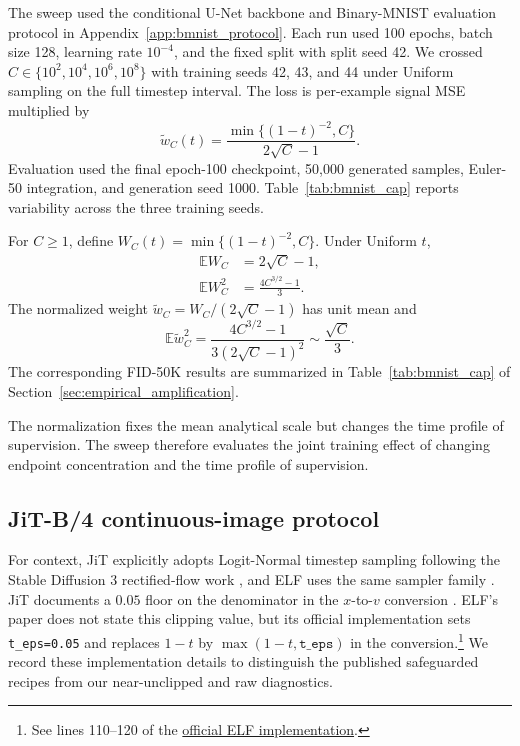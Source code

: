 \documentclass{article}
\theoremstyle{plain}
\theoremstyle{definition}
\theoremstyle{remark}
\newcommand{\Ex}{\mathbb{E}}
\begin{document}
The sweep used the conditional U-Net backbone and Binary-MNIST evaluation protocol in Appendix~\ref{app:bmnist_protocol}. Each run used 100 epochs, batch size 128, learning rate $10^{-4}$, and the fixed split with split seed 42. We crossed $C\in\{10^2,10^4,10^6,10^8\}$ with training seeds 42, 43, and 44 under Uniform sampling on the full timestep interval. The loss is per-example signal MSE multiplied by
\begin{equation}
\widetilde w_C(t)=\frac{\min\{(1-t)^{-2},C\}}{2\sqrt C-1}.
\label{eq:cap_weight}
\end{equation}
Evaluation used the final epoch-100 checkpoint, 50,000 generated samples, Euler-50 integration, and generation seed 1000. Table~\ref{tab:bmnist_cap} reports variability across the three training seeds.

For $C\ge1$, define $W_C(t)=\min\{(1-t)^{-2},C\}$. Under Uniform $t$,
\begin{align}
\Ex W_C&=2\sqrt C-1,\\
\Ex W_C^2&=\frac{4C^{3/2}-1}{3}.
\end{align}
The normalized weight $\widetilde w_C=W_C/(2\sqrt C-1)$ has unit mean and
\begin{equation}
\Ex\widetilde w_C^2
=\frac{4C^{3/2}-1}{3(2\sqrt C-1)^2}
\sim\frac{\sqrt C}{3}.
\end{equation}
The corresponding FID-50K results are summarized in Table~\ref{tab:bmnist_cap} of Section~\ref{sec:empirical_amplification}.

The normalization fixes the mean analytical scale but changes the time profile of supervision. The sweep therefore evaluates the joint training effect of changing endpoint concentration and the time profile of supervision.

\FloatBarrier
\subsection{JiT-B/4 continuous-image protocol}
\label{app:jit_details}

For context, JiT explicitly adopts Logit-Normal timestep sampling following the Stable Diffusion 3 rectified-flow work \citep{esser2024scaling,li2025back}, and ELF uses the same sampler family \citep{hu2026elf}. JiT documents a $0.05$ floor on the denominator in the $x$-to-$v$ conversion \citep{li2025back}. ELF's paper does not state this clipping value, but its official implementation sets \texttt{t\_eps=0.05} and replaces $1-t$ by $\max(1-t,\texttt{t\_eps})$ in the conversion.\footnote{See lines 110--120 of the \href{https://github.com/lillian039/ELF/blob/main/src/utils/sampling_utils.py\#L110-L120}{official ELF implementation}.} We record these implementation details to distinguish the published safeguarded recipes from our near-unclipped and raw diagnostics.
\end{document}
